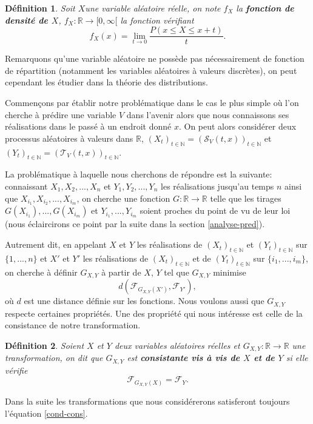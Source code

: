 \documentclass[a4paper,10pt]{article}
\newtheorem{definition}{Définition}
\begin{document}
\begin{definition}
	Soit $X$une variable aléatoire réelle, on note $f_{X}$ la \textbf{fonction de densité de $X$}, $f_{X}: \mathbb{R}\to [0,\infty[$ la fonction vérifiant
	\begin{equation}
		f_{X}(x)=\lim_{t\to 0} \frac{P(x\leq X \leq x+t)}{t}.
	\end{equation}
\end{definition}
Remarquons qu'une variable aléatoire ne possède pas nécessairement de fonction de répartition (notamment les variables aléatoires à valeurs discrètes), on peut cependant les étudier dans la théorie des distributions.


Commençons par établir notre problématique dans le cas le plus simple où l'on cherche à prédire une variable $V$ dans l'avenir alors que nous connaissons ses réalisations dans le passé à un endroit donné $x$.
On peut alors considérer deux processus aléatoires à valeurs dans $\mathbb{R}$, $(X_t)_{t \in \mathbb{N}}=(\mathcal{S}_{V}(t, x))_{t \in \mathbb{N}}$ et $(Y_t)_{t \in \mathbb{N}}=(\mathcal{T}_{V}(t, x))_{t \in \mathbb{N}}$.

La problématique à laquelle nous cherchons de répondre est la suivante: connaissant $X_1,X_2,...,X_n$ et $Y_1,Y_2,...,Y_n$ les réalisations jusqu'au temps $n$ ainsi que $X_{i_1},X_{i_2},...,X_{i_m}$, on cherche une fonction $G: \mathbb{R} \to \mathbb{R}$ telle que les tirages $G(X_{i_1}),..., G(X_{i_m})$ et $Y_{i_1},...,Y_{i_m}$ soient proches du point de vu de leur loi (nous éclaircirons ce point par la suite dans la section \ref{analyse-pred}). 

Autrement dit, en appelant $X$ et $Y$ les réalisations de $(X_t)_{t \in \mathbb{N}}$ et $(Y_t)_{t \in \mathbb{N}}$ sur $\{1,...,n\}$ et $X'$ et $Y'$ les réalisations de $(X_t)_{t \in \mathbb{N}}$ et de $(Y_t)_{t \in \mathbb{N}}$ sur $\{i_1,...,i_m\}$, on cherche à définir $G_{X,Y}$ à partir de $X$, $Y$ tel que $G_{X,Y}$ minimise 
\[d(\mathcal{F}_{G_{X,Y}(X')}, \mathcal{F}_{Y'}),\]
où $d$ est une distance définie sur les fonctions.
Nous voulons aussi que $G_{X,Y}$ respecte certaines propriétés. Une des propriété qui nous intéresse est celle de la consistance de notre transformation.

\begin{definition}
	Soient $X$ et $Y$ deux variables aléatoires réelles et $G_{X,Y}: \mathbb{R}\to \mathbb{R}$ une transformation, on dit que $G_{X,Y}$ est \textbf{consistante vis à vis de $X$ et de $Y$} si elle vérifie 
\begin{equation}
	\label{cond-cons}
	{\mathcal{F}_{G_{X,Y}(X)}}= \mathcal{F}_{Y}.
\end{equation}
\end{definition}
Dans la suite les transformations que nous considérerons satisferont toujours l'équation \eqref{cond-cons}.
\end{document}
